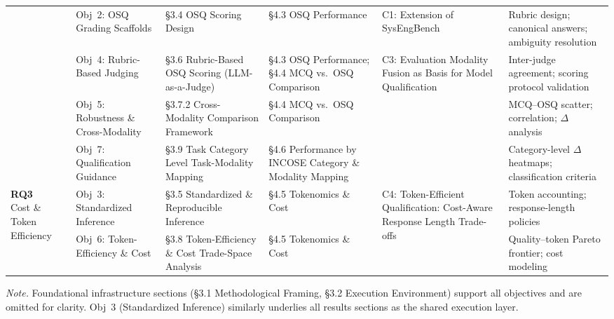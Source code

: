 \begin{landscape}
\begin{table}[htbp]
{\begin{tabular}{p{1.4cm} p{3.8cm} p{2.8cm} p{4.5cm} p{3.8cm} p{4.0cm}}
& Obj~2: OSQ Grading Scaffolds
& \S3.4 OSQ Scoring Design
& \S4.3 OSQ Performance
& C1: Extension of SysEngBench
& Rubric design; canonical answers; ambiguity resolution \\
\cmidrule(l){2-6}

& Obj~4: Rubric-Based Judging
& \S3.6 Rubric-Based OSQ Scoring (LLM-as-a-Judge)
& \S4.3 OSQ Performance; \S4.4 MCQ vs.\ OSQ Comparison
& \multirow{3}{*}{\parbox{4.0cm}{C3: Evaluation Modality Fusion as Basis for Model Qualification}}
& Inter-judge agreement; scoring protocol validation \\
\cmidrule(l){2-4}\cmidrule(l){6-6}

& Obj~5: Robustness \& Cross-Modality
& \S3.7.2 Cross-Modality Comparison Framework
& \S4.4 MCQ vs.\ OSQ Comparison
& & MCQ--OSQ scatter; correlation; $\Delta$ analysis \\
\cmidrule(l){2-4}\cmidrule(l){6-6}

& Obj~7: Qualification Guidance
& \S3.9 Task Category Level Task-Modality Mapping
& \S4.6 Performance by INCOSE Category \& Modality Mapping
& & Category-level $\Delta$ heatmaps; classification criteria \\

\midrule

\multirow{4}{*}{\parbox{1.4cm}{\textbf{RQ3}\\ Cost \& Token Efficiency}}
& Obj~3: Standardized Inference
& \S3.5 Standardized \& Reproducible Inference
& \S4.5 Tokenomics \& Cost
& \multirow{2}{*}{\parbox{4.0cm}{C4: Token-Efficient Qualification: Cost-Aware Response Length Trade-offs}}
& Token accounting; response-length policies \\
\cmidrule(l){2-4}\cmidrule(l){6-6}

& Obj~6: Token-Efficiency \& Cost
& \S3.8 Token-Efficiency \& Cost Trade-Space Analysis
& \S4.5 Tokenomics \& Cost
& & Quality--token Pareto frontier; cost modeling \\

\bottomrule
\end{tabular}
}

\vspace{4pt}
\noindent\textit{Note.} Foundational infrastructure sections (\S3.1 Methodological Framing, \S3.2 Execution Environment) support all objectives and are omitted for clarity. Obj~3 (Standardized Inference) similarly underlies all results sections as the shared execution layer.
\end{table}
\end{landscape}
